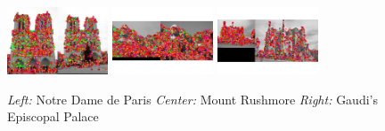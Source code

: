 \begin{figure}[h]
    \centering
    \includegraphics[width=3cm]{../code/eval_ND.png}
    \includegraphics[width=3cm]{../code/eval_MR.png}
    \includegraphics[width=3cm]{../code/eval_EG.png}
    \caption{\emph{Left:} Notre Dame de Paris \emph{Center:} Mount Rushmore \emph{Right:} Gaudi's Episcopal Palace}
    \label{fig:result1}
\end{figure}



